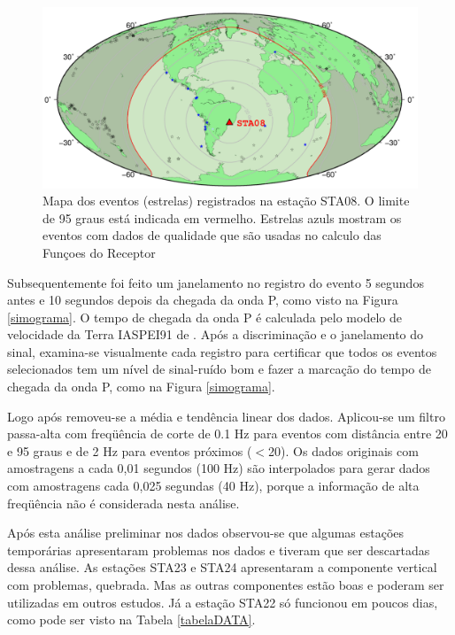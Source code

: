 \begin{figure}[!ht]
\centering
\includegraphics[scale=0.6]{Figs/mapa_de_eventos.png}
\caption[Mapa dos eventos registrados na estação STA08.]{Mapa dos eventos (estrelas) registrados na estação STA08. O limite de 95 graus está indicada em vermelho. Estrelas azuls mostram os eventos com dados de qualidade que são usadas no calculo das Funçoes do Receptor}
\label{mapa_eventos}
\end{figure}

Subsequentemente foi feito um janelamento no registro do evento 5 segundos antes e 10 segundos depois da chegada da onda P, como visto na Figura \ref{simograma}. O tempo de chegada da onda P é calculada pelo modelo de velocidade da Terra IASPEI91 de \cite{kennet_iaspei_1991}. Após a discriminação e o janelamento do sinal, examina-se visualmente cada registro para certificar que todos os eventos selecionados tem um nível de sinal-ruído bom e fazer a marcação do tempo de chegada da onda P, como na Figura \ref{simograma}. 

Logo após removeu-se a média e tendência linear dos dados. Aplicou-se um filtro passa-alta com freqüência de corte de 0.1 Hz para eventos com distância entre 20 e 95 graus e de 2 Hz para eventos próximos ($<$20). Os dados originais com amostragens a cada 0,01 segundos (100 Hz) são interpolados para gerar dados com amostragens cada 0,025 segundas (40 Hz), porque a informação de alta freqüência não é considerada nesta análise.

Após esta análise preliminar nos dados observou-se que algumas estações temporárias apresentaram problemas nos dados e tiveram que ser descartadas dessa análise. As estações STA23 e STA24 apresentaram a componente vertical com problemas, quebrada. Mas as outras componentes estão boas e poderam ser utilizadas em outros estudos. Já a estação STA22 só funcionou em poucos dias, como pode ser visto na Tabela \ref{tabelaDATA}.


